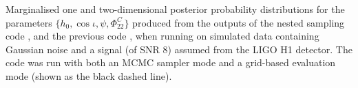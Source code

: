 \label{fig:simsignal_single}
Marginalised one and two-dimensional posterior probability distributions
for the parameters $\{h_0, \cos{\iota}, \psi, \Phi_{22}^C\}$
produced from the outputs of the nested sampling code \lppen, and the previous
code \lppe, when running on simulated data containing Gaussian noise and a signal 
(of SNR 8) assumed from the LIGO H1 detector. The \lppe code was run with both an MCMC sampler mode and a grid-based
evaluation mode (shown as the black dashed line).
